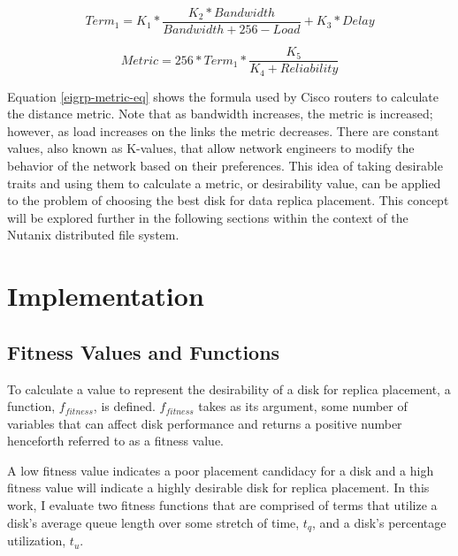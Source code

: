 \documentclass[12pt]{article}
\begin{document}
  \begin{equation}
    Term_{1} = K_{1} * \frac{K_{2} * Bandwidth}{Bandwidth + 256 - Load} + K_{3} * Delay
  \end{equation}

  \begin{equation} \label{eigrp-metric-eq}
    Metric = 256 * Term_{1} * \frac{K_{5}}{K_{4} + Reliability}
  \end{equation}

  Equation \ref{eigrp-metric-eq} shows the formula used by Cisco routers to
  calculate the distance metric. Note that as bandwidth increases, the metric
  is increased; however, as load increases on the links the metric decreases.
  There are constant values, also known as K-values, that allow network
  engineers to modify the behavior of the network based on their preferences.
  This idea of taking desirable traits and using them to calculate a metric, or
  desirability value, can be applied to the problem of choosing the best disk
  for data replica placement. This concept will be explored further in the
  following sections within the context of the Nutanix distributed file system.


\newpage
\FloatBarrier
\section{Implementation}

  \subsection{Fitness Values and Functions} \label{section-fitness}

  To calculate a value to represent the desirability of a disk for replica
  placement, a function, $f_{fitness}$, is defined. $f_{fitness}$ takes as its
  argument, some number of variables that can affect disk performance and
  returns a positive number henceforth referred to as a fitness value.
  
  A low fitness value indicates a poor placement candidacy for a disk and a
  high fitness value will indicate a highly desirable disk for replica
  placement. In this work, I evaluate two fitness functions that are
  comprised of terms that utilize a disk's average queue length over some
  stretch of time, $t_{q}$, and a disk's percentage utilization, $t_{u}$.
\end{document}
